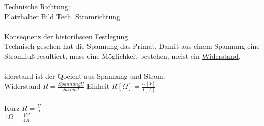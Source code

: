 Technische Richtung:\\
Platzhalter Bild Tech. Stromrichtung\\
\\
Konsequenz der historihscen Festlegung\\
Technisch gesehen hat die Spannung das Primat. Damit aus einem Spannung eine Stromfluß resultiert, muss eine Möglichkeit bestehen, meist ein \underline{Widerstand}.\\
\\
iderstand ist der Qocient aus Spannung und Strom:\\
Widerstand $R = \frac{Spannung U}{Strom I} $ Einheit $R[\Omega] = \frac{U[V]}{I[A]}$\\
\\
Kurz $ R = \frac{U}{I} $\\
$ 1\Omega = \frac{1V}{1A} $\\

